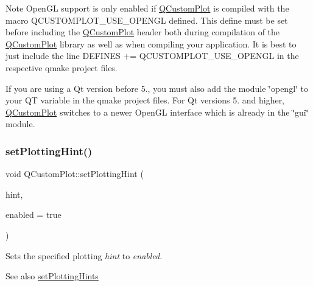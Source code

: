 \begin{DoxyNote}{Note}
Open\+GL support is only enabled if \hyperlink{classQCustomPlot}{Q\+Custom\+Plot} is compiled with the macro {\ttfamily Q\+C\+U\+S\+T\+O\+M\+P\+L\+O\+T\+\_\+\+U\+S\+E\+\_\+\+O\+P\+E\+N\+GL} defined. This define must be set before including the \hyperlink{classQCustomPlot}{Q\+Custom\+Plot} header both during compilation of the \hyperlink{classQCustomPlot}{Q\+Custom\+Plot} library as well as when compiling your application. It is best to just include the line {\ttfamily D\+E\+F\+I\+N\+ES += Q\+C\+U\+S\+T\+O\+M\+P\+L\+O\+T\+\_\+\+U\+S\+E\+\_\+\+O\+P\+E\+N\+GL} in the respective qmake project files. 

If you are using a Qt version before 5., you must also add the module \char`\"{}opengl\char`\"{} to your {\ttfamily QT} variable in the qmake project files. For Qt versions 5. and higher, \hyperlink{classQCustomPlot}{Q\+Custom\+Plot} switches to a newer Open\+GL interface which is already in the \char`\"{}gui\char`\"{} module. 
\end{DoxyNote}
\mbox{\label{classQCustomPlot_a3b7c97bb6c16464e9e15190c07abe9a9}} 
\subsubsection{\texorpdfstring{set\+Plotting\+Hint()}{setPlottingHint()}}
{\footnotesize\ttfamily void Q\+Custom\+Plot\+::set\+Plotting\+Hint (\begin{DoxyParamCaption}\item[{\hyperlink{namespaceQCP_a5400e5fcb9528d92002ddb938c1f4ef4}{Q\+C\+P\+::\+Plotting\+Hint}}]{hint,  }\item[{bool}]{enabled = {\ttfamily true} }\end{DoxyParamCaption})}

Sets the specified plotting {\itshape hint} to {\itshape enabled}.

\begin{DoxySeeAlso}{See also}
\hyperlink{classQCustomPlot_a94a33cbdadbbac5934843508bcfc210d}{set\+Plotting\+Hints} 
\end{DoxySeeAlso}
\mbox{\label{classQCustomPlot_a94a33cbdadbbac5934843508bcfc210d}} 
